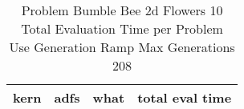 \begin{table}[H]
\caption{Problem  Bumble Bee 2d  Flowers 10\\Total Evaluation Time per Problem \\ Use Generation Ramp  Max Generations 208\\}
\begin{center}
\scalebox{1.0} %
{
\begin{tabular}{lllr}
\hline
kern & adfs & what & total eval time \\
\hline


\end{tabular}
}
\end{center}
\end{table}

